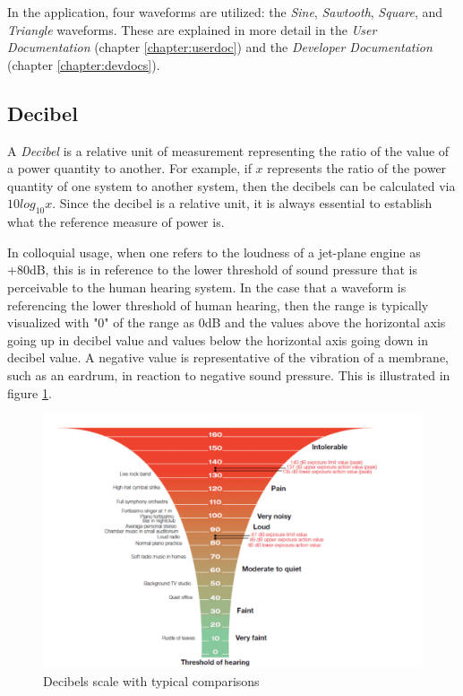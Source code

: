 \documentclass[a4paper,12pt]{report}
\begin{document}
In the application, four waveforms are utilized: the \emph{Sine}, \emph{Sawtooth}, \emph{Square}, and \emph{Triangle} waveforms. These are explained in more detail in the \emph{User Documentation} (chapter \ref{chapter:userdoc}) and the \emph{Developer Documentation} (chapter \ref{chapter:devdocs}).

\subsection{Decibel}
\label{subsec:decibel}
A \emph{Decibel} is a relative unit of measurement representing the ratio of the value of a power quantity to another. For example, if $x$ represents the ratio of the power quantity of one system to another system, then the decibels can be calculated via $10 log_10 x$. Since the decibel is a relative unit, it is always essential to establish what the reference measure of power is. 

In colloquial usage, when one refers to the loudness of a jet-plane engine as +80dB, this is in reference to the lower threshold of sound pressure that is perceivable to the human hearing system. In the case that a waveform is referencing the lower threshold of human hearing, then the range is typically visualized with "0" of the range as 0dB and the values above the horizontal axis going up in decibel value and values below the horizontal axis going down in decibel value. A negative value is representative of the vibration of a membrane, such as an eardrum, in reaction to negative sound pressure. This is illustrated in figure \ref{fig:decibelsscale}.

\begin{figure}[h]
    \centering
    \includegraphics[width=36em]{DecibelsScale.png}
    \caption{Decibels scale with typical comparisons \cite{noiselevel}}
    \label{fig:decibelsscale}
\end{figure}
\end{document}
